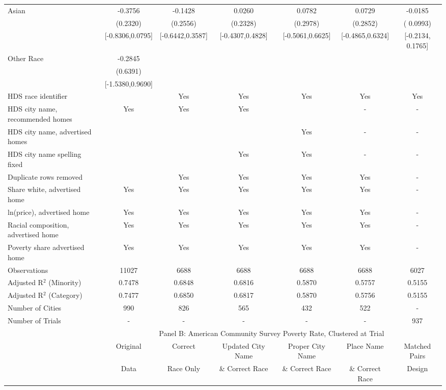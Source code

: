 \begin{table}[htbp]
{\begin{tabular}{l*{6}{c}}
Asian & -0.3756 & -0.1428 & 0.0260 & 0.0782 & 0.0729 & -0.0185 \\
 & (0.2320) & (0.2556) & (0.2328) & (0.2978) & (0.2852) & ( 0.0993) \\
 & [-0.8306,0.0795] & [-0.6442,0.3587] & [-0.4307,0.4828] & [-0.5061,0.6625] & [-0.4865,0.6324] & [-0.2134,  0.1765] \\
Other Race & -0.2845 &  &  &  &  &  \\
 & (0.6391) &  &  &  &  &  \\
 & [-1.5380,0.9690] &  &  &  &  &  \\
\midrule
HDS race identifier & & Yes & Yes & Yes & Yes & Yes \\
HDS city name, recommended homes & Yes & Yes & Yes & & - & -\\
HDS city name, advertised homes &  &  &  & Yes & - & -\\
HDS city name spelling fixed & & & Yes & Yes & - & -\\
Duplicate rows removed &  & Yes & Yes & Yes & Yes & - \\
\midrule
Share white, advertised home  & Yes & Yes & Yes & Yes & Yes & - \\
ln(price), advertised home  & Yes & Yes & Yes & Yes & Yes & - \\
Racial composition, advertised home & Yes & Yes & Yes & Yes & Yes & - \\
Poverty share advertised home & Yes & Yes & Yes & Yes & Yes & - \\
Observations & 11027 & 6688 & 6688 & 6688 & 6688 & 6027 \\
Adjusted R$^2$ (Minority) & 0.7478 & 0.6848 & 0.6816 & 0.5870 & 0.5757 & 0.5155 \\
Adjusted R$^2$ (Category) & 0.7477 & 0.6850 & 0.6817 & 0.5870 & 0.5756 & 0.5155 \\
Number of Cities & 990 & 826 & 565 & 432 & 522 & - \\
Number of Trials & - & - & - & - & - & 937 \\
\bottomrule
\toprule
& \multicolumn{6}{c}{Panel B: American Community Survey Poverty Rate, Clustered at Trial}\\
\toprule
                    &\multicolumn{1}{c}{Original}&\multicolumn{1}{c}{Correct}&\multicolumn{1}{c}{Updated City Name}&\multicolumn{1}{c}{Proper City Name}&\multicolumn{1}{c}{Place Name}&\multicolumn{1}{c}{Matched Pairs}\\
                      &\multicolumn{1}{c}{Data}&\multicolumn{1}{c}{Race Only}&\multicolumn{1}{c}{\& Correct Race}&\multicolumn{1}{c}{\& Correct Race}&\multicolumn{1}{c}{\& Correct Race}&\multicolumn{1}{c}{Design}\\                  

\end{tabular}}
\end{table}
